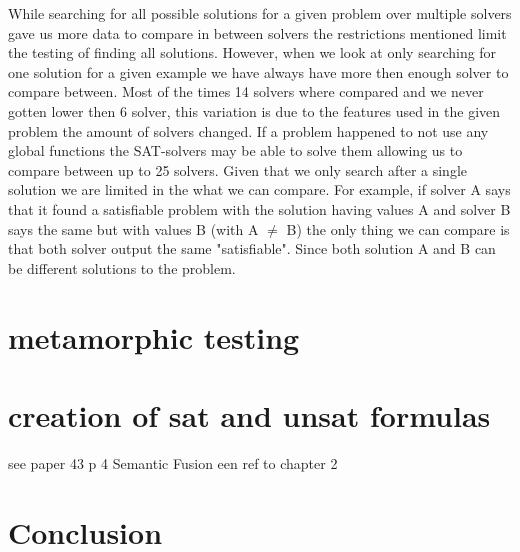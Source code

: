 While searching for all possible solutions for a given problem over multiple solvers gave us more data to compare in between solvers the restrictions mentioned limit the testing of finding all solutions. However, when we look at only searching for one solution for a given example we have always have more then enough solver to compare between. Most of the times 14 solvers where compared and we never gotten lower then 6 solver, this variation is due to the features used in the given problem the amount of solvers changed. If a problem happened to not use any global functions the SAT-solvers may be able to solve them allowing us to compare between up to 25 solvers. Given that we only search after a single solution we are limited in the what we can compare. For example, if solver A says that it found a satisfiable problem with the solution having values A and solver B says the same but with values B (with A $\neq$ B) the only thing we can compare is that both solver output the same "satisfiable". Since both solution A and B can be different solutions to the problem.


\section{metamorphic testing}


\section{creation of sat and unsat formulas}
see paper 43 p 4
Semantic Fusion
\cite{43YinYang}
een ref to chapter 2

\section{Conclusion}
\label{impl:conclusion}


